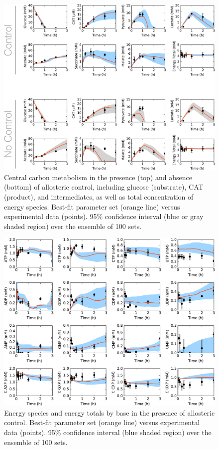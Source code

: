 \documentclass[12pt]{article}
\begin{document}
\begin{figure}[ht]
\centering
\includegraphics[width=1.00\textwidth]{./Figures/Fig_1_Carbon.pdf}
\caption{Central carbon metabolism in the presence (top) and absence (bottom) of allosteric control, including glucose (substrate), CAT (product), and intermediates, as well as total concentration of energy species. Best-fit parameter set (orange line) versus experimental data (points). 95\% confidence interval (blue or gray shaded region) over the ensemble of 100 sets.}
\label{fig:Carbon}
\end{figure}

\begin{figure}[ht]
\centering
\includegraphics[width=1.00\textwidth]{./Figures/Fig_2_Energy.pdf}
\caption{Energy species and energy totals by base in the presence of allosteric control. Best-fit parameter set (orange line) versus experimental data (points). 95\% confidence interval (blue shaded region) over the ensemble of 100 sets.}
\label{fig:Energy}
\end{figure}
\end{document}
